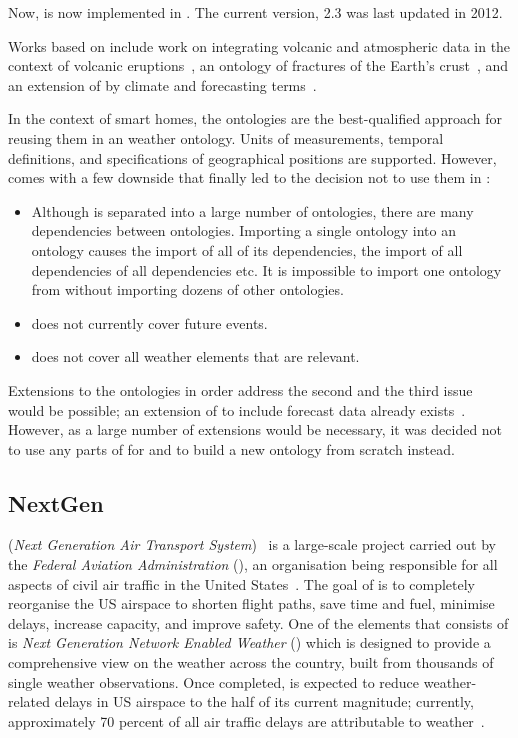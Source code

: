 Now,  is now implemented in . The current version,  2.3 was last updated in 2012.

Works based on  include work on integrating volcanic and atmospheric data in the context of volcanic eruptions~\cite{sweet_example1}, an ontology of fractures of the Earth's crust~\cite{sweet_example2}, and an extension of  by climate and forecasting terms~\cite{sweet_example3}.

In the context of smart homes, the  ontologies are the best-qualified approach for reusing them in an weather ontology. Units of measurements, temporal definitions, and specifications of geographical positions are supported. However,  comes with a few downside that finally led to the decision not to use them in \smarthomeweather:
\begin{itemize}
  \item Although  is separated into a large number of ontologies, there are many dependencies between ontologies. Importing a single ontology into an  ontology causes the import of all of its dependencies, the import of all dependencies of all dependencies etc. It is impossible to import one ontology from  without importing dozens of other ontologies.
  
  \item {} does not currently cover future events.
  
  \item {} does not cover all weather elements that are relevant.
\end{itemize}

Extensions to the  ontologies in order address the second and the third issue would be possible; an extension of  to include forecast data already exists~\cite{sweet_example3}. However, as a large number of extensions would be necessary, it was decided not to use any parts of  for \smarthomeweather and to build a new ontology from scratch instead.

\subsection{NextGen}
\label{subsec:onto4}

 (\emph{Next Generation Air Transport System})~\cite{NextGen} is a large-scale project carried out by the \emph{Federal Aviation Administration} (), an organisation being responsible for all aspects of civil air traffic in the United States~\cite{faa}. The goal of  is to completely reorganise the US airspace to shorten flight paths, save time and fuel, minimise delays, increase capacity, and improve safety. One of the elements that  consists of is \emph{Next Generation Network Enabled Weather} () which is designed to provide a comprehensive view on the weather across the country, built from thousands of single weather observations. Once completed,  is expected to reduce weather-related delays in US airspace to the half of its current magnitude; currently, approximately 70 percent of all air traffic delays are attributable to weather~\cite{nnew}.

